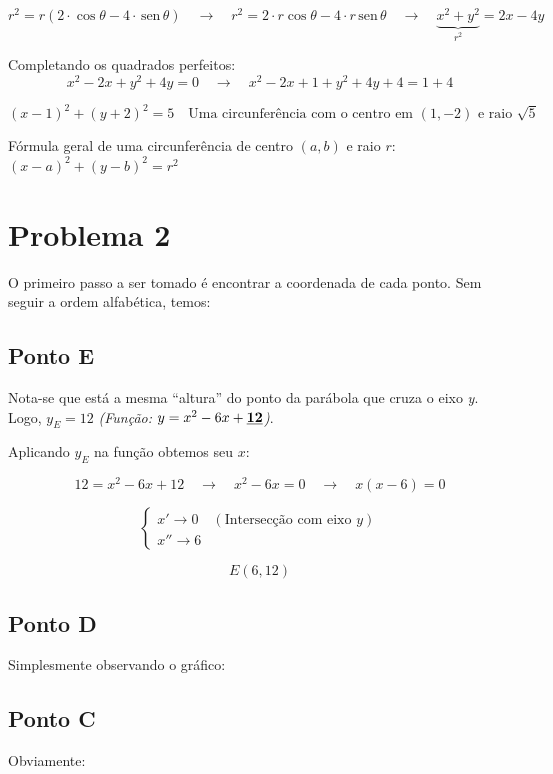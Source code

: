 \documentclass[a4paper,12pt,final]{article}
\newcommand{\qrq}{\quad\rightarrow\quad}
\newcommand{\sen}{\textrm{sen}}
\begin{document}
$$
r^2 = r(2\cdot\cos\theta - 4\cdot\,\sen\,\theta)
  \qrq
r^2 = 2\cdot r\cos\theta - 4\cdot r\,\sen\,\theta
  \qrq
\underbrace{x^2 + y^2}_{r^2} = 2x - 4y
$$

Completando os quadrados perfeitos:
$$
x^2 - 2x + y^2 + 4y = 0
  \qrq
x^2 - 2x + 1 + y^2 + 4y + 4 = 1 + 4
$$

$$
\boxed{(x - 1)^2 + (y + 2)^2 = 5}\quad
\boxed{\textrm{Uma circunferência com o centro em }(1,-2)
\textrm{ e raio }\sqrt{5}}
$$

Fórmula geral de uma circunferência de centro $(a,b)$ e raio $r$:
$ \boxed{(x - a)^2 + (y - b)^2 = r^2} $

\newpage

\section*{Problema 2}

O primeiro passo a ser tomado é encontrar a coordenada de cada ponto. Sem
seguir a ordem alfabética, temos:

\subsection*{Ponto E}

Nota-se que está a mesma ``altura'' do ponto da parábola que cruza o eixo
\emph{y}. Logo, $y_E = 12$ \textit{(Função: $y = x^2 - 6x +
\textbf{\underline{12}}$)}.

Aplicando $y_E$ na função obtemos seu $x$:

$$ 12 = x^2 - 6x + 12 \qrq x^2 - 6x = 0 \qrq x(x - 6) = 0 $$

$$
\left\{\begin{array}{rl}
x'  \rightarrow 0 & (\textrm{Intersecção com eixo }y)\\
x'' \rightarrow 6 &
\end{array}\right.
$$

$$ \boxed{E(6,12)} $$

\subsection*{Ponto D}

Simplesmente observando o gráfico: 

\subsection*{Ponto C}

Obviamente: 
\end{document}
